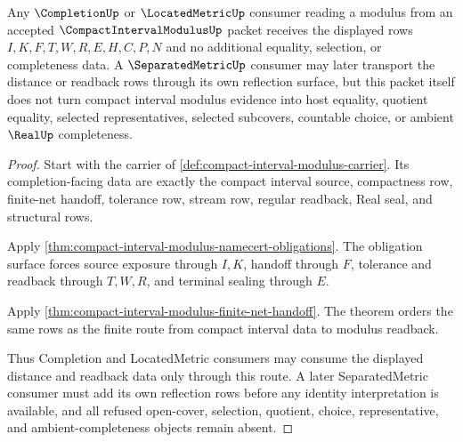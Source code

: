 \begin{theorem}
\label{thm:compact-interval-modulus-completion-readback}
Any $\CompletionUp$ or $\LocatedMetricUp$ consumer reading a modulus from an accepted $\CompactIntervalModulusUp$ packet receives the displayed rows $I,K,F,T,W,R,E,H,C,P,N$ and no additional equality, selection, or completeness data. A $\SeparatedMetricUp$ consumer may later transport the distance or readback rows through its own reflection surface, but this packet itself does not turn compact interval modulus evidence into host equality, quotient equality, selected representatives, selected subcovers, countable choice, or ambient $\RealUp$ completeness.
\end{theorem}
\begin{proof}
Start with the carrier of \autoref{def:compact-interval-modulus-carrier}. Its completion-facing data are exactly the compact interval source, compactness row, finite-net handoff, tolerance row, stream row, regular readback, Real seal, and structural rows.

Apply \autoref{thm:compact-interval-modulus-namecert-obligations}. The obligation surface forces source exposure through $I,K$, handoff through $F$, tolerance and readback through $T,W,R$, and terminal sealing through $E$.

Apply \autoref{thm:compact-interval-modulus-finite-net-handoff}. The theorem orders the same rows as the finite route from compact interval data to modulus readback.

Thus Completion and LocatedMetric consumers may consume the displayed distance and readback data only through this route. A later SeparatedMetric consumer must add its own reflection rows before any identity interpretation is available, and all refused open-cover, selection, quotient, choice, representative, and ambient-completeness objects remain absent.
\end{proof}



